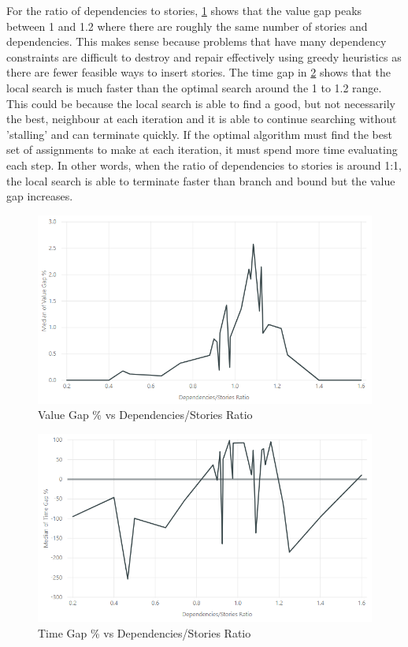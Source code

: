 For the ratio of dependencies to stories, \cref{fig:value_gap_vs_dependencies_stories} shows that the value gap peaks between 1 and 1.2 where there are roughly the same number of stories and dependencies. This makes sense because problems that have many dependency constraints are difficult to destroy and repair effectively using greedy heuristics as there are fewer feasible ways to insert stories. The time gap in \cref{fig:time_gap_vs_dependencies_stories} shows that the local search is much faster than the optimal search around the 1 to 1.2 range. This could be because the local search is able to find a good, but not necessarily the best, neighbour at each iteration and it is able to continue searching without 'stalling' and can terminate quickly. If the optimal algorithm must find the best set of assignments to make at each iteration, it must spend more time evaluating each step. In other words, when the ratio of dependencies to stories is around 1:1, the local search is able to terminate faster than branch and bound but the value gap increases.

\begin{figure}[h!]
    \centering
    \includegraphics[width=\textwidth]{Figures/Results/annealing_value_gap_dependencies_stories.png}
    \caption{Value Gap \% vs Dependencies/Stories Ratio}
    \label{fig:value_gap_vs_dependencies_stories}
\end{figure}

\begin{figure}[h!]
    \centering
    \includegraphics[width=\textwidth]{Figures/Results/annealing_time_gap_dependencies_stories.png}
    \caption{Time Gap \% vs Dependencies/Stories Ratio}
    \label{fig:time_gap_vs_dependencies_stories}
\end{figure}

